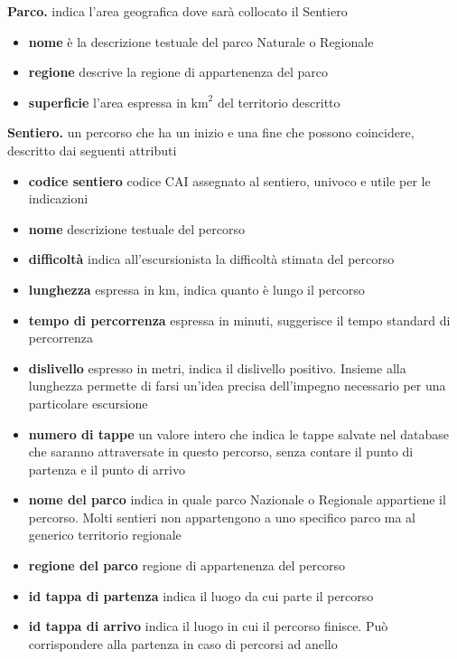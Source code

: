 \documentclass[10pt, a4paper]{article}
\begin{document}
\noindent \textbf{Parco.} indica l'area geografica dove sarà collocato il Sentiero
\begin{itemize}
    \item \textbf{nome} è la descrizione testuale del parco Naturale o Regionale
    \item \textbf{regione} descrive la regione di appartenenza del parco
    \item \textbf{superficie} l'area espressa in $\mathrm{km}^2$ del territorio descritto
\end{itemize}

\noindent \textbf{Sentiero.} un percorso che ha un inizio e una fine che possono coincidere, descritto dai seguenti attributi
\begin{itemize}
    \item \textbf{codice sentiero} codice CAI assegnato al sentiero, univoco e utile per le indicazioni
    \item \textbf{nome} descrizione testuale del percorso
    \item \textbf{difficoltà} indica all'escursionista la difficoltà stimata del percorso
    \item \textbf{lunghezza} espressa in km, indica quanto è lungo il percorso
    \item \textbf{tempo di percorrenza} espressa in minuti, suggerisce il tempo standard di percorrenza
    \item \textbf{dislivello} espresso in metri, indica il dislivello positivo. Insieme alla lunghezza permette di farsi un'idea precisa dell'impegno necessario per una particolare escursione
    \item \textbf{numero di tappe} un valore intero che indica le tappe salvate nel database che saranno attraversate in questo percorso, senza contare il punto di partenza e il punto di arrivo
    \item \textbf{nome del parco} indica in quale parco Nazionale o Regionale appartiene il percorso. Molti sentieri non appartengono a uno specifico parco ma al generico territorio regionale
    \item \textbf{regione del parco} regione di appartenenza del percorso
    \item \textbf{id tappa di partenza} indica il luogo da cui parte il percorso
    \item \textbf{id tappa di arrivo} indica il luogo in cui il percorso finisce. Può corrispondere alla partenza in caso di percorsi ad anello
\end{itemize}
\end{document}
